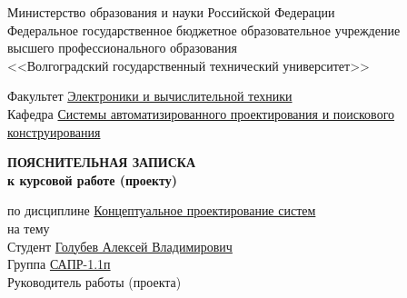 \begin{titlepage}
    \begin{center}
        Министерство образования и науки Российской Федерации \\
        Федеральное государственное бюджетное образовательное учреждение\\
        высшего профессионального образования\\
        <<Волгоградский государственный технический университет>>\\
    \end{center}
    Факультет \underline{\hspace{1cm}Электроники и вычислительной техники\hspace{4.75cm}}\\
    Кафедра \underline{\hspace{1.4cm}Системы автоматизированного проектирования и поискового\hspace{0.3cm}}\\
    \underline{конструирования\hspace{13.3cm}}
    \vspace{1cm}
    \begin{center}
        \large \MakeUppercase{\textbf{пояснительная записка}} \\
        \normalsize\vspace{-0.2cm}\textbf{к курсовой работе (проекту)}
    \end{center}
    \begin{flushleft}
        по дисциплине \underline{\hspace{1cm}Концептуальное проектирование систем\hspace{3.8cm}}\\
        на тему \underline{\hspace{15.2cm}}\\
        \underline{\hspace{\textwidth}}
        Студент \underline{\hspace{1cm}Голубев Алексей Владимирович\hspace{2cm}} \\
        Группа \underline{\hspace{1cm}САПР-1.1п\hspace{2cm}}\\
        Руководитель работы (проекта) \underline{\hspace{5cm}}
            \hspace{0.5cm} \underline{\hspace{4.2cm}}\\

\end{flushleft}
\end{titlepage}

